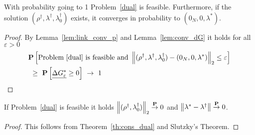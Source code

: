 \begin{theorem}
  \label{th:cons_dual}
  With probability going to 1 Problem~\ref{dual} is feasible.
  Furthermore, if the solution 
$
(\rho^\dagger,\lambda^\dagger,\lambda_0^\dagger)
$
exists,
it
converges in probability to 
$
(0_N,0,\lambda^*)
$.
\end{theorem}
\begin{proof}
  By Lemma~\ref{lem:link_conv_p} and Lemma~\ref{lem:conv_dG}
  it holds for all $\varepsilon>0$
  \begin{align*}
    &
    \P
    \left[ 
      \text{Problem~\ref{dual} is feasible and }
      \norm{
(\rho^\dagger,\lambda^\dagger,\lambda_0^\dagger)
-
(0_N,0,\lambda^*)
      }_2
      \le \varepsilon
    \right]
    \\
    &
    \ 
    \ge
    \ 
    \P
    \left[ \underline{\Delta G^*_\varepsilon}\ge 0 \right]
    \ 
    \to
    \ 
    1
  \end{align*}
\end{proof}
\begin{corollary}
  \label{cor:2}
  If Problem~\ref{dual} is feasible it holds
  $\left\lVert(\rho^\dagger,\lambda_0^\dagger)\right\rVert_2\overset{\mathbf{P}}{\to}0$
  and
  $\left\lVert\lambda^*-\lambda^\dagger\right\rVert\overset{\mathbf{P}}{\to}0$.
\end{corollary}
\begin{proof}
  This follows from Theorem~\ref{th:cons_dual}
  and Slutzky's Theorem.
\end{proof}
